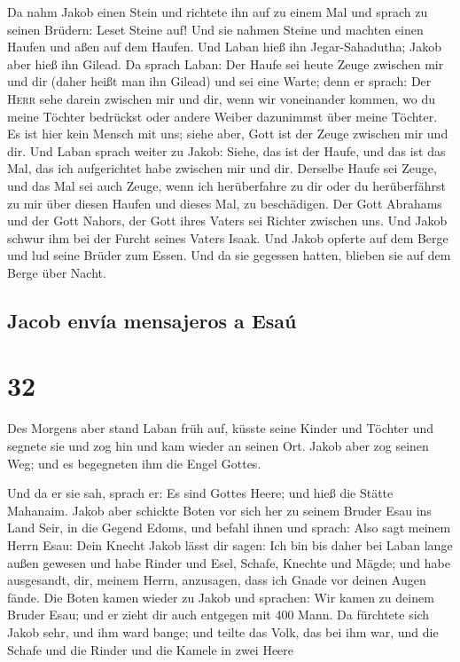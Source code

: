  Da nahm Jakob einen Stein und richtete ihn auf zu einem
Mal  und sprach zu seinen Brüdern: Leset Steine auf! Und
sie nahmen Steine und machten einen Haufen und aßen auf dem Haufen.
 Und Laban hieß ihn Jegar-Sahadutha; Jakob aber hieß ihn
Gilead.  Da sprach Laban: Der Haufe sei heute Zeuge
zwischen mir und dir (daher heißt man ihn Gilead)  und
sei eine Warte; denn er sprach: Der \textsc{Herr} sehe darein zwischen
mir und dir, wenn wir voneinander kommen,  wo du meine
Töchter bedrückst oder andere Weiber dazunimmst über meine Töchter. Es
ist hier kein Mensch mit uns; siehe aber, Gott ist der Zeuge zwischen
mir und dir.  Und Laban sprach weiter zu Jakob: Siehe,
das ist der Haufe, und das ist das Mal, das ich aufgerichtet habe
zwischen mir und dir.  Derselbe Haufe sei Zeuge, und das
Mal sei auch Zeuge, wenn ich herüberfahre zu dir oder du herüberfährst
zu mir über diesen Haufen und dieses Mal, zu beschädigen.
 Der Gott Abrahams und der Gott Nahors, der Gott ihres
Vaters sei Richter zwischen uns.  Und Jakob schwur ihm
bei der Furcht seines Vaters Isaak. Und Jakob opferte auf dem Berge und
lud seine Brüder zum Essen. Und da sie gegessen hatten, blieben sie auf
dem Berge über Nacht.

\hypertarget{jacob-envuxeda-mensajeros-a-esauxfa}{%
\subsection{Jacob envía mensajeros a
Esaú}\label{jacob-envuxeda-mensajeros-a-esauxfa}}

\hypertarget{section-31}{%
\section{32}\label{section-31}}

 Des Morgens aber stand Laban früh auf, küsste seine
Kinder und Töchter und segnete sie und zog hin und kam wieder an seinen
Ort.  Jakob aber zog seinen Weg; und es begegneten ihm die
Engel Gottes.

 Und da er sie sah, sprach er: Es sind Gottes Heere; und
hieß die Stätte Mahanaim.  Jakob aber schickte Boten vor
sich her zu seinem Bruder Esau ins Land Seir, in die Gegend Edoms,
 und befahl ihnen und sprach: Also sagt meinem Herrn Esau:
Dein Knecht Jakob lässt dir sagen: Ich bin bis daher bei Laban lange
außen gewesen  und habe Rinder und Esel, Schafe, Knechte
und Mägde; und habe ausgesandt, dir, meinem Herrn, anzusagen, dass ich
Gnade vor deinen Augen fände.  Die Boten kamen wieder zu
Jakob und sprachen: Wir kamen zu deinem Bruder Esau; und er zieht dir
auch entgegen mit 400 Mann.  Da fürchtete sich Jakob sehr,
und ihm ward bange; und teilte das Volk, das bei ihm war, und die Schafe
und die Rinder und die Kamele in zwei Heere


